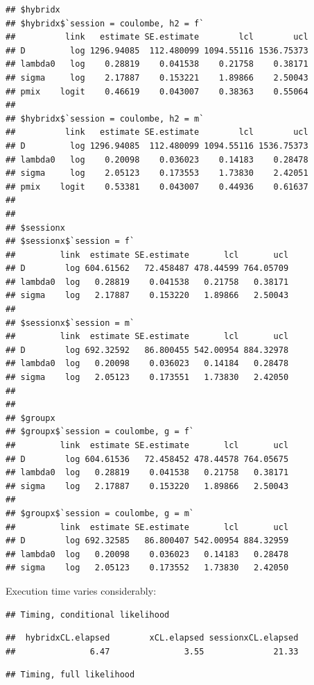\documentclass[
]{book}
\begin{document}
\begin{verbatim}
## $hybridx
## $hybridx$`session = coulombe, h2 = f`
##          link   estimate SE.estimate        lcl        ucl
## D         log 1296.94085  112.480099 1094.55116 1536.75373
## lambda0   log    0.28819    0.041538    0.21758    0.38171
## sigma     log    2.17887    0.153221    1.89866    2.50043
## pmix    logit    0.46619    0.043007    0.38363    0.55064
## 
## $hybridx$`session = coulombe, h2 = m`
##          link   estimate SE.estimate        lcl        ucl
## D         log 1296.94085  112.480099 1094.55116 1536.75373
## lambda0   log    0.20098    0.036023    0.14183    0.28478
## sigma     log    2.05123    0.173553    1.73830    2.42051
## pmix    logit    0.53381    0.043007    0.44936    0.61637
## 
## 
## $sessionx
## $sessionx$`session = f`
##         link  estimate SE.estimate       lcl       ucl
## D        log 604.61562   72.458487 478.44599 764.05709
## lambda0  log   0.28819    0.041538   0.21758   0.38171
## sigma    log   2.17887    0.153220   1.89866   2.50043
## 
## $sessionx$`session = m`
##         link  estimate SE.estimate       lcl       ucl
## D        log 692.32592   86.800455 542.00954 884.32978
## lambda0  log   0.20098    0.036023   0.14184   0.28478
## sigma    log   2.05123    0.173551   1.73830   2.42050
## 
## 
## $groupx
## $groupx$`session = coulombe, g = f`
##         link  estimate SE.estimate       lcl       ucl
## D        log 604.61536   72.458452 478.44578 764.05675
## lambda0  log   0.28819    0.041538   0.21758   0.38171
## sigma    log   2.17887    0.153220   1.89866   2.50043
## 
## $groupx$`session = coulombe, g = m`
##         link  estimate SE.estimate       lcl       ucl
## D        log 692.32585   86.800407 542.00954 884.32959
## lambda0  log   0.20098    0.036023   0.14183   0.28478
## sigma    log   2.05123    0.173552   1.73830   2.42050
\end{verbatim}

Execution time varies considerably:

\begin{verbatim}
## Timing, conditional likelihood
\end{verbatim}

\begin{verbatim}
##  hybridxCL.elapsed        xCL.elapsed sessionxCL.elapsed 
##               6.47               3.55              21.33
\end{verbatim}

\begin{verbatim}
## Timing, full likelihood
\end{verbatim}
\end{document}
